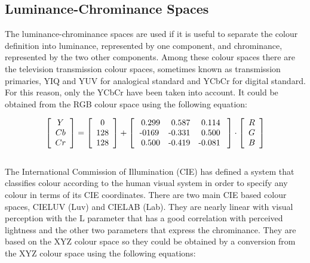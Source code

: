 \documentclass[final,a4paper,12pt,english]{UnicaPhdThesis3}
\begin{document}
	\subsection{Luminance-Chrominance Spaces}  %
	The luminance-chrominance spaces are used if it is useful to separate the colour definition into luminance, represented by one component, and chrominance, represented by the two other components. Among these colour spaces there are the television transmission colour spaces, sometimes known as transmission primaries, YIQ and YUV for analogical standard and YCbCr for digital standard. For this reason, only the YCbCr have been taken into account. It could be obtained from the RGB colour space using the following equation:
	
	\begin{equation}\label{Ycbcr}
	\left [ {  \begin{array}{c} Y  \\ Cb   \\ Cr \end{array} } \right ] = \left [{ \begin{array}{c} 0  \\ 128   \\ 128  \end{array} } \right ] +
	\left [ { \begin{array}{c c c} \mbox{ 0.299}  & \mbox{ 0.587} & \mbox{ 0.114 } \\ \mbox{-0169} & \mbox{-0.331} & \mbox{ 0.500 } \\ \mbox{ 0.500} & \mbox{-0.419} & \mbox{-0.081 }  \end{array} } \right ] \cdot \left [ { \begin{array}{c} R  \\ G  \\ B  \end{array} } \right ] 
	\end{equation}
	\\
	The International Commission of Illumination (CIE) has defined a system that classifies colour according to the human visual system in order to specify any colour in terms of its CIE coordinates. There are two main CIE based colour spaces, CIELUV (Luv) and CIELAB (Lab). They are nearly linear with visual perception with the L parameter that has a good correlation with perceived lightness and the other two parameters that express the chrominance. They are based on the XYZ colour space so they could be obtained by a conversion from the XYZ colour space using the following equations:
	
\end{document}
